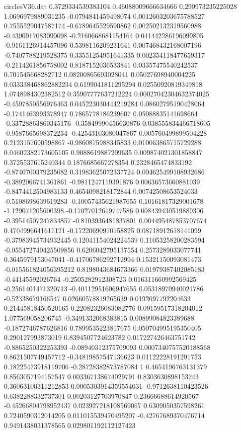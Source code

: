 \begin{filecontents}{circlesV36.dat}
0.3729334539383104	0.46088009666634666	0.290973235225028
1.0696979889031235	-0.0794841459498074	0.0012603203675788527
0.7555529047587174	-0.6789645529590862	0.002502132319560988
-0.4390917083090098	-0.2160668681154164	0.041442286196099805
-0.9161126914457096	0.5398116209231641	0.007468432168007196
-0.7407788219528375	0.33551254951641335	0.002354118477659317
-0.2114261856758002	0.8187152036533841	0.03357475540242537
0.701545668282712	0.08200865693028041	0.05027698940004225
0.033338468862882234	0.6199041811295294	0.02550920819349818
1.0748984302382512	0.35907777637212224	0.00027042304632374025
-0.4597850556976463	0.045223030444219284	0.08602795190428064
-0.1741463993378947	0.7865778186239607	0.05088835141698664
-0.33728863860345176	-0.35849990456630876	0.038555834466718605
-0.9587665698372234	-0.42543103080047867	0.005760499899504228
0.2123157690598867	-0.9860875988345833	0.010063865715729288
0.04602382173605105	0.9088619887209635	0.009874021301858847
0.3725537615240344	0.1876685667278354	0.2328465474833192
-0.8740700379235082	0.31983625072337724	0.004625499108932686
-0.3892066741361861	-0.9811247119391876	0.00636573660881039
-0.8474412504983133	0.4654098218172844	0.00742508653524033
-0.5108698639619283	-0.10057435621987655	0.10161817329001678
-1.129071205600398	-0.17027012619747586	0.008439430519889306
-0.39514507247834857	-0.8103936481837801	0.004495487853707674
0.4704996641617121	-0.17220690970158825	0.08718912618141099
-0.37983945734932445	0.12041154024224539	0.11053258200283594
-0.055472740425509856	0.6206042795137554	0.2573289033077741
0.3645979153047041	-0.41706786292712994	0.15321150093081473
-0.015561824056395212	0.8198043684673366	0.01979387402085183
-0.44145592026764	-0.2505282912308723	0.016311660992569425
-0.2561401471320713	-0.40112951606947655	0.05318970940021786
-0.52338679166547	0.02660578819265639	0.0192697792204633
0.21445818450520165	0.22082326083082776	0.09159517318204012
1.077569058206745	-0.3491332068383815	0.00899084823389688
-0.1872746787626816	0.7899535223817675	0.050704995195350405
0.290127993873019	0.8394507724623782	0.017227426463751742
-0.8865250322253393	-0.08940312375709093	0.0007340757520188568
0.8621507749457712	-0.34819857547136623	0.01122228191291753
0.18225473918119706	-0.28728382873787084	1
0.4654196763131379	0.8563057194157547	0.003367138674029791
0.8303630898153743	0.36063100311212853	0.0005303914359554031
-0.9712638110423526	0.6382288332737301	0.00203127703970847
0.23666688614920567	-0.45266804798952437	0.023927218108569067
0.6309050357598261	0.7240590312014205	0.011015539470495207
-0.42767689370476714	0.9491438031378565	0.029801192112127423

\end{filecontents}
